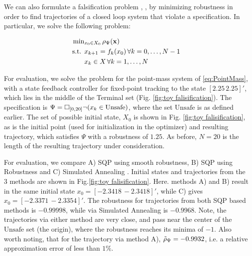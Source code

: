 
We can also formulate a falsification problem \cite{AbbasATVA11_LinFalsification}, \cite{AbbasF_HybridSA12}, \cite{Deshmukh15_IterativeApproaches} by minimizing robustness in order to find trajectories of a closed loop system that violate a specification. In particular, we solve the following problem:

\begin{subequations}
\label{eq:falsification}
\begin{align}
\text{min}&_{x_0 \in X_0 } \, \rho_{\Psi}(\mathbf{x}) \nonumber \\
\text{s.t. } & x_{k+1} = f_k(x_0) \, \forall k=0,\dotsc,N-1 \\
&  x_{k} \in X \, \forall k=1,\dotsc,N
\end{align}
\end{subequations}

For evaluation, we solve the problem for the point-mass system of \eqref{eq:PointMass}, with a state feedback controller for fixed-point tracking to the state $[2.25\,2.25]'$, which lies in the middle of the Terminal set (Fig. \ref{fig:toy falisification}). The specification is $\Psi=\square_{[0,20]} \neg (x_k \in \text{Unsafe})$, where the set $\text{Unsafe}$ is as defined earlier. The set of possible initial state, $X_0$ is shown in Fig. \ref{fig:toy falisification}, as is the initial point (used for initialization in the optimizer) and resulting trajectory, which satisfies $\Psi$ with a robustness of $1.25$. As before, $N=20$ is the length of the resulting trajectory under consideration.

For evaluation, we compare A) SQP using smooth robustness, B) SQP using Robustness and C) Simulated Annealing \cite{SABOOK}. Initial states and trajectories from the 3 methods are shown in Fig.\ref{fig:toy falisification}. Here. methods A) and B) result in the same initial state $x_0=[-2.3418\,-2.3418]'$, while C) gives $x_0=[-2.3371\,-2.3354]'$. The robustness for trajectories from both SQP based methods is $-0.99998$, while via Simulated Annealing is $-0.9968$. Note, the trajectories via either method are very close, and pass near the center of the $\text{Unsafe}$ set (the origin), where the robustness reaches its minima of $-1$. Also worth noting, that for the trajectory via method A), $\tilde{\rho}_{\Psi}=-0.9932$, i.e. a relative approximation error of less than $1\%$.

